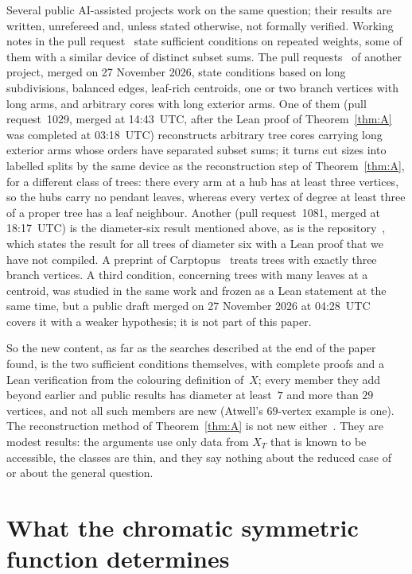 \documentclass[11pt]{article}
\theoremstyle{definition}
\theoremstyle{remark}
\begin{document}
Several public AI-assisted projects work on the same question; their results are
written, unrefereed and, unless stated otherwise, not formally verified. Working
notes in the pull request~\cite{aur} state sufficient conditions on repeated
weights, some of them with a similar device of distinct subset sums. The pull
requests~\cite{sc} of another project, merged on 27 November 2026, state
conditions based on long subdivisions, balanced edges, leaf-rich centroids, one
or two branch vertices with long arms, and arbitrary cores with long exterior
arms. One of them (pull request~1029, merged at 14:43~UTC, after the Lean proof of
Theorem~\ref{thm:A} was completed at 03:18~UTC) reconstructs arbitrary tree cores
carrying long exterior arms whose orders have separated subset sums; it turns cut
sizes into labelled splits by the same device as the reconstruction step of
Theorem~\ref{thm:A}, for a different class of trees: there every arm at a hub
has at least three vertices, so the hubs carry no pendant leaves, whereas every
vertex of degree at least three of a proper tree has a leaf neighbour.
Another (pull request~1081, merged at 18:17~UTC) is the diameter-six result
mentioned above, as is the repository~\cite{kyf}, which states the result for all trees of
diameter six with a Lean proof that we have not compiled. A preprint of
Carptopus~\cite{carp} treats trees with exactly three branch vertices. A third
condition, concerning trees with many leaves at a centroid, was studied in the
same work and frozen as a Lean statement at the same time, but a public draft
merged on 27 November 2026 at 04:28~UTC~\cite[pull request~977]{sc} covers it
with a weaker hypothesis; it is not part of this paper.

So the new content, as far as the searches described at the end of the paper
found, is the two sufficient conditions themselves, with complete proofs and a
Lean verification from the colouring definition of~$X$; every member they add
beyond earlier and public results has diameter at least~$7$ and more than $29$
vertices, and not all such members are new (Atwell's $69$-vertex example is
one). The reconstruction method of Theorem~\ref{thm:A} is not new
either~\cite{atwell1}. They are modest results: the arguments use only data from $X_T$
that is known to be accessible, the classes are thin, and they say nothing about
the reduced case of~\cite{ot} or about the general question.

\section{What the chromatic symmetric function determines}\label{sec:known}
\end{document}
